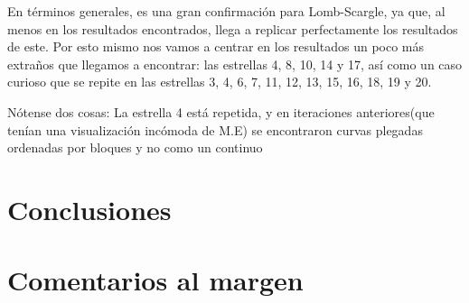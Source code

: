 \documentclass[10pt,twocolumn]{article}
\begin{document}
En términos generales, es una gran confirmación para Lomb-Scargle, ya que, al menos en los resultados encontrados, 
llega a replicar perfectamente los resultados de este. Por esto mismo nos vamos a centrar en los resultados un poco más extraños 
que llegamos a encontrar: las estrellas 4, 8, 10, 14 y 17, así como un caso curioso que se repite en las estrellas 
3, 4, 6, 7, 11, 12, 13, 15, 16, 18, 19 y 20.

Nótense dos cosas: La estrella 4 está repetida, y en iteraciones anteriores(que tenían una visualización incómoda de M.E)
se encontraron curvas plegadas ordenadas por bloques y no como un continuo

\section{Conclusiones}


\section*{Comentarios al margen}
\end{document}

